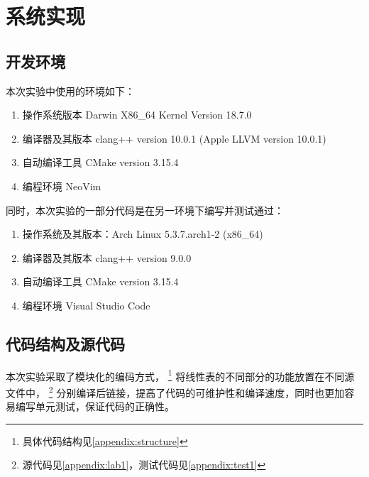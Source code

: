 \section{系统实现}
\subsection{开发环境}
本次实验中使用的环境如下：
\begin{enumerate}
    \item 操作系统版本 Darwin X86\_64 Kernel Version 18.7.0
    \item 编译器及其版本 clang++ version 10.0.1 (Apple LLVM version 10.0.1)
    \item 自动编译工具 CMake version 3.15.4
    \item 编程环境 NeoVim
\end{enumerate}
同时，本次实验的一部分代码是在另一环境下编写并测试通过：
\begin{enumerate}
    \item 操作系统及其版本：Arch Linux 5.3.7.arch1-2 (x86\_64)
    \item 编译器及其版本 clang++ version 9.0.0
    \item 自动编译工具 CMake version 3.15.4
    \item 编程环境 Visual Studio Code
\end{enumerate}
\subsection{代码结构及源代码}
本次实验采取了模块化的编码方式，
\footnote{具体代码结构见\autoref{appendix:structure}}
将线性表的不同部分的功能放置在不同源文件中，
\footnote{源代码见\autoref{appendix:lab1}，测试代码见\autoref{appendix:test1}}
分别编译后链接，提高了代码的可维护性和编译速度，同时也更加容易编写单元测试，保证代码的正确性。
